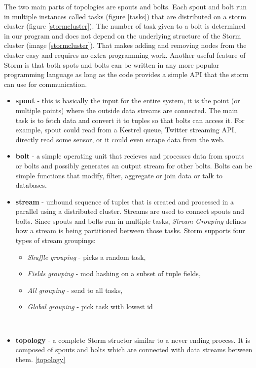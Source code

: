 \documentclass[journal]{IEEEtran/IEEEtran}
\begin{document}
The two main parts of topologies are spouts and bolts. Each spout and bolt run in multiple instances called tasks (figure \ref{tasks}) that are distributed on a storm cluster (figure \ref{stormcluster}). The number of task given to a bolt is determined in our program and does not depend on the underlying structure of the Storm cluster (image \ref{stormcluster}). That makes adding and removing nodes from the cluster easy and requires no extra programming work. Another useful feature of Storm is that both spots and bolts can be written in any more popular programming language as long as the code provides a simple API that the storm can use for communication. \\

\begin{itemize}
    \item \textbf{spout} - this is basically the input for the entire system, it is the point (or multiple points) where the outside data streams are connected. The main task is to fetch data and convert it to tuples so that bolts can access it. For example, spout could read from a Kestrel queue, Twitter streaming API, directly read some sensor, or it could even scrape data from the web.\\
    \item \textbf{bolt} - a simple operating unit that recieves and processes data from spouts or bolts and possibly generates an output stream for other bolts. Bolts can be simple functions that modify, filter, aggregate or join data or talk to databases. \\
    \item \textbf{stream} - unbound sequence of tuples that is created and processed in a parallel using a distributed cluster. Streams are used to connect spouts and bolts. Since spouts and bolts run in multiple tasks, \textit{Stream Grouping} defines how a stream is being partitioned between those tasks. Storm supports four types of stream groupings:
        \begin{itemize}
            \item \textit{Shuffle grouping} - picks a random task, 
            \item \textit{Fields grouping} - mod hashing on a subset of tuple fields, 
            \item \textit{All grouping} - send to all tasks, 
            \item \textit{Global grouping} - pick task with lowest id
        \end{itemize} 
        \ \\
    \item \textbf{topology} - a complete Storm structor similar to a never ending process. It is composed of spouts and bolts which are connected with data streams between them. \ref{topology} \\
\end{itemize} 
\ \\
\end{document}
